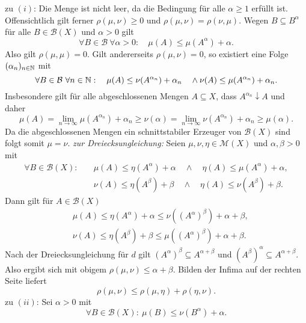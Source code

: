 \begin{proof*}
    zu $(i)$: Die Menge ist nicht leer, da die Bedingung für alle $\alpha \geq 1$ erfüllt ist. Offensichtlich gilt ferner $\rho(\mu, \nu) \geq 0$ und $\rho(\mu, \nu) = \rho(\nu, \mu)$. 
    Wegen $B \subseteq B^{\alpha}$ für alle $B \in \mathcal{B}(X)$ und $\alpha > 0$ gilt 
    $$
        \forall B \in \mathcal{B} \ \forall \alpha > 0: \quad \mu(A) \leq \mu(A^{\alpha}) + \alpha.
    $$
    Also gilt $\rho(\mu, \mu) = 0$. Gilt andererseits $\rho(\mu, \nu) = 0$, so existiert eine Folge $(\alpha_n)_{n \in \mathbb{N}}$ mit 
    $$
    \forall B \in \mathcal{B} \ \forall n \in \N: \quad \mu(A) \leq \nu(A^{\alpha_n}) + \alpha_n \quad \land \nu(A) \leq \mu(A^{\alpha_n}) + \alpha_n.
    $$
    Insbesondere gilt für alle abgeschlossenen Mengen $A \subseteq X$, dass $A^{\alpha_n} \downarrow A$ und daher
    $$
        \mu(A) = \lim_{n \to \infty} \mu(A^{\alpha_n}) + \alpha_n \geq \nu(\alpha) = \lim_{n \to \infty} \nu(A^{\alpha_n}) + \alpha_n \geq \mu(\alpha). 
    $$
    Da die abgeschlossenen Mengen ein schnittstabiler Erzeuger von $\mathcal{B}(X)$ sind folgt somit $\mu = \nu$.
    \newline
    \textit{zur Dreiecksungleichung:} Seien $\mu, \nu, \eta \in \mathcal{M}(X)$ und $\alpha, \beta > 0$ mit 
    \begin{align*}
        \forall B \in \mathcal{B}(X): \quad &\mu(A) \leq \eta(A^{\alpha}) + \alpha \quad \land \quad \eta(A) \leq \mu(A^{\alpha}) + \alpha, \\\
                                            &\nu(A) \leq \eta(A^{\beta}) + \beta \quad \land \quad \eta(A) \leq \nu(A^{\beta}) + \beta.
    \end{align*}
    Dann gilt für $A \in \mathcal{B}(X)$
    \begin{align*}
        &\mu(A) \leq \eta(A^{\alpha}) + \alpha \leq \nu((A^{\alpha})^{\beta}) + \alpha + \beta, \\\
        &\nu(A) \leq \eta(A^{\beta}) + \beta \leq \mu((A^{\alpha})^{\beta}) + \alpha + \beta. 
    \end{align*}
    Nach der Dreiecksungleichung für $d$ gilt $(A^{\alpha})^{\beta} \subseteq A^{\alpha + \beta}$ und $(A^{\beta})^{\alpha} \subseteq A^{\alpha + \beta}$. Also ergibt sich mit obigem $\rho(\mu, \nu) \leq \alpha + \beta$. 
    Bilden der Infima auf der rechten Seite liefert
    $$
        \rho(\mu, \nu) \leq \rho(\mu, \eta) + \rho(\eta, \nu).
    $$
    zu $(ii)$: Sei $\alpha > 0$ mit 
    $$
        \forall B \in \mathcal{B}(X): \ \mu(B) \leq \nu(B^{\alpha}) + \alpha.
    $$

\end{proof*}
